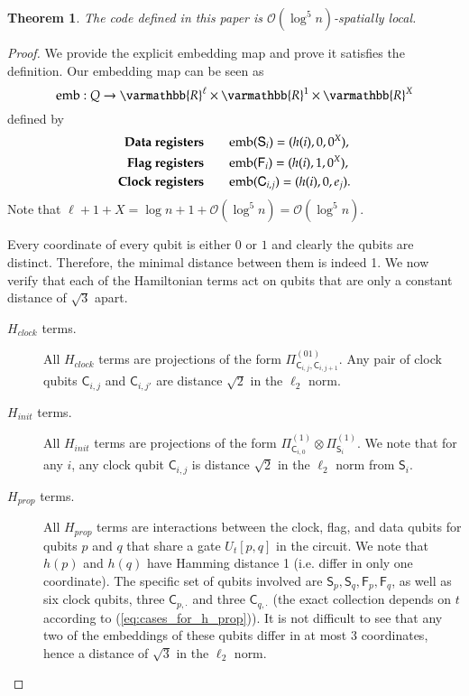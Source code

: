 \documentclass[11pt,letterpaper]{article}
\newtheorem{theorem}{Theorem}[section]
\theoremstyle{definition}
\theoremstyle{remark}
\let\mathbb\varmathbb
\numberwithin{equation}{section}
\theoremstyle{definition}
\newcommand{\sC}{{\mathsf{C}}}
\newcommand{\sF}{{\mathsf{F}}}
\newcommand{\sS}{{\mathsf{S}}}
\begin{document}
\begin{theorem}
The code defined in this paper is $\mathcal{O}(\log^5 n)$-spatially local.
\end{theorem}

\begin{proof}
We provide the explicit embedding map and prove it satisfies the definition. Our embedding map can be seen as
\begin{equation}
\emb: Q \rightarrow \mathbb{R}^\ell \times \mathbb{R}^1 \times \mathbb{R}^X
\end{equation}
defined by
\begin{align}
\textbf{Data registers}  &\qquad \emb(\sS_i) = (h(i), 0, 0^X), \\
\textbf{Flag registers}  &\qquad \emb(\sF_i) = (h(i), 1, 0^X), \\
\textbf{Clock registers} &\qquad \emb(\sC_{i,j}) = (h(i), 0, e_j).
\end{align}
Note that $\ell + 1 + X = \log n + 1 + \mathcal{O}(\log^5 n) = \mathcal{O}(\log ^5 n)$.

Every coordinate of every qubit is either $0$ or $1$ and clearly the qubits are distinct. Therefore, the minimal distance between them is indeed 1. We now verify that each of the Hamiltonian terms act on qubits that are only a constant distance of $\sqrt{3}$ apart.
\begin{description}
\item[$H_{clock}$ terms.] All $H_{clock}$ terms are projections of the form $\Pi_{\sC_{i,j},\sC_{i,j+1}}^{(01)}$. Any pair of clock qubits $\sC_{i,j}$ and $\sC_{i,j'}$ are distance $\sqrt{2}$ in the $\ell_2$ norm.

\item[$H_{init}$ terms.] All $H_{init}$ terms are projections of the form $\Pi_{\sC_{i,0}}^{(1)} \otimes \Pi_{\sS_i}^{(1)}$. We note that for any $i$, any clock qubit $\sC_{i,j}$ is distance $\sqrt{2}$ in the $\ell_2$ norm from $\sS_i$.

\item[$H_{prop}$ terms.] All $H_{prop}$ terms are interactions between the clock, flag, and data qubits for qubits $p$ and $q$ that share a gate $U_t[p,q]$ in the circuit. We note that $h(p)$ and $h(q)$ have Hamming distance 1 (i.e. differ in only one coordinate). The specific set of qubits involved are $\sS_p, \sS_q, \sF_p, \sF_q$, as well as six clock qubits, three $\sC_{p,\cdot}$ and three $\sC_{q, \cdot}$ (the exact collection depends on $t$ according to (\ref{eq:cases_for_h_prop})). It is not difficult to see that any two of the embeddings of these qubits differ in at most 3 coordinates, hence a distance of $\sqrt{3}$ in the $\ell_2$ norm.


\end{description}
\end{proof}
\end{document}
